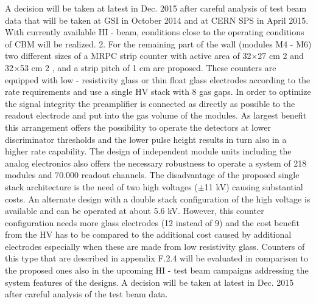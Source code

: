 A decision will be taken at latest in Dec. 2015 after careful analysis of test beam data that will
be taken at GSI in October 2014 and at CERN SPS in April 2015. With currently available HI -
beam, conditions close to the operating conditions of CBM will be realized.
2. For the remaining part of the wall (modules M4 - M6) two different sizes of a MRPC strip counter
with active area of 32$\times$27 cm 2 and 32$\times$53 cm 2 , and a strip pitch of 1 cm are proposed. These
counters are equipped with low - resistivity glass or thin float glass electrodes according to the rate
requirements and use a single HV stack with 8 gas gaps. In order to optimize the signal integrity
the preamplifier is connected as directly as possible to the readout electrode and put into the gas
volume of the modules. As largest benefit this arrangement offers the possibility to operate the
detectors at lower discriminator thresholds and the lower pulse height results in turn also in a higher
rate capability. The design of independent module units including the analog electronics also offers
the necessary robustness to operate a system of 218 modules and 70.000 readout channels.
The disadvantage of the proposed single stack architecture is the need of two high voltages ($\pm$11 kV)
causing substantial costs. An alternate design with a double stack configuration of the high voltage
is available and can be operated at about 5.6 kV. However, this counter configuration needs more
glass electrodes (12 instead of 9) and the cost benefit from the HV has to be compared to the
additional cost caused by additional electrodes especially when these are made from low resistivity
glass. Counters of this type that are described in appendix F.2.4 will be evaluated in comparison to
the proposed ones also in the upcoming HI - test beam campaigns addressing the system features of
the designs. A decision will be taken at latest in Dec. 2015 after careful analysis of the test beam
data.


